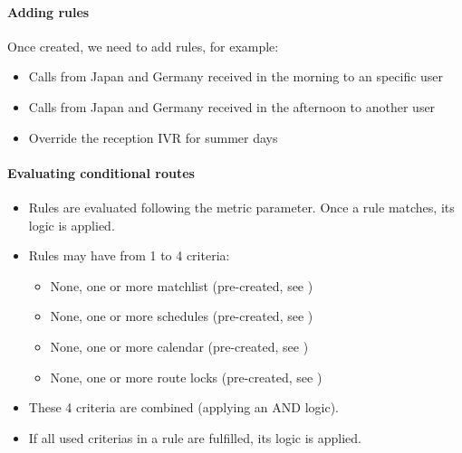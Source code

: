 \documentclass[letterpaper,10pt,english]{sphinxmanual}
\begin{document}
\paragraph{Adding rules}
\label{administration_portal/client/vpbx/routing_endpoints/conditional_routes:adding-rules}
Once created, we need to add rules, for example:
\begin{itemize}
\item {} 
Calls from Japan and Germany received in the morning to an specific user

\item {} 
Calls from Japan and Germany received in the afternoon to another user

\item {} 
Override the reception IVR for summer days

\end{itemize}


\paragraph{Evaluating conditional routes}
\label{administration_portal/client/vpbx/routing_endpoints/conditional_routes:evaluating-conditional-routes}\begin{itemize}
\item {} 
Rules are evaluated following the metric parameter. Once a rule matches, its
logic is applied.

\item {} 
Rules may have from 1 to 4 criteria:
\begin{itemize}
\item {} 
None, one or more matchlist (pre-created, see {\hyperref[administration_portal/client/vpbx/routing_tools/match_lists:match\string-lists]{}})

\item {} 
None, one or more schedules (pre-created, see {\hyperref[administration_portal/client/vpbx/routing_tools/schedules:schedules]{}})

\item {} 
None, one or more calendar (pre-created, see {\hyperref[administration_portal/client/vpbx/routing_tools/calendars:calendars]{}})

\item {} 
None, one or more route locks (pre-created, see {\hyperref[administration_portal/client/vpbx/routing_tools/route_locks:id1]{}})

\end{itemize}

\item {} 
These 4 criteria are combined (applying an AND logic).

\item {} 
If all used criterias in a rule are fulfilled, its logic is applied.

\end{itemize}
\end{document}
